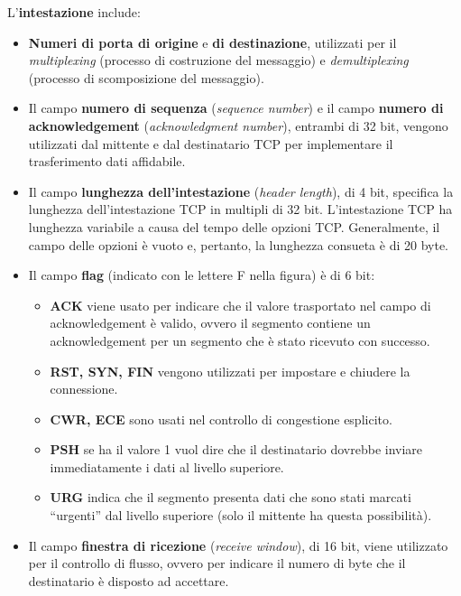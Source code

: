 \documentclass[a4paper]{article}
\newcommand{\dquotes}[1]{``#1''}
\begin{document}
	\noindent
	L'\textbf{intestazione} include:
	\begin{itemize}
		\item \textbf{Numeri di porta di origine} e \textbf{di destinazione}, utilizzati per il \emph{multiplexing} (processo di costruzione del messaggio) e \emph{demultiplexing} (processo di scomposizione del messaggio).
		
		\item Il campo \textbf{numero di sequenza} (\emph{sequence number}) e il campo \textbf{numero di acknowledgement} (\emph{acknowledgment number}), entrambi di 32 bit, vengono utilizzati dal mittente e dal destinatario TCP per implementare il trasferimento dati affidabile.
		
		\item Il campo \textbf{lunghezza dell'intestazione} (\emph{header length}), di 4 bit, specifica la lunghezza dell’intestazione TCP in multipli di 32 bit. L’intestazione TCP ha lunghezza variabile a causa del tempo delle opzioni TCP. Generalmente, il campo delle opzioni è vuoto e, pertanto, la lunghezza consueta è di 20 byte.
		
		\item Il campo \textbf{flag} (indicato con le lettere F nella figura) è di 6 bit:
		\begin{itemize}
			\item \textbf{ACK} viene usato per indicare che il valore trasportato nel campo di acknowledgement è valido, ovvero il segmento contiene un acknowledgement per un segmento che è stato ricevuto con successo.
			
			\item \textbf{RST, SYN, FIN} vengono utilizzati per impostare e chiudere la connessione.
			
			\item \textbf{CWR, ECE} sono usati nel controllo di congestione esplicito.
			
			\item \textbf{PSH} se ha il valore 1 vuol dire che il destinatario dovrebbe inviare immediatamente i dati al livello superiore.
			
			\item \textbf{URG} indica che il segmento presenta dati che sono stati marcati \dquotes{urgenti} dal livello superiore (solo il mittente ha questa possibilità).
		\end{itemize}
	
		\item Il campo \textbf{finestra di ricezione} (\emph{receive window}), di 16 bit, viene utilizzato per il controllo di flusso, ovvero per indicare il numero di byte che il destinatario è disposto ad accettare.
		

\end{itemize}
\end{document}
